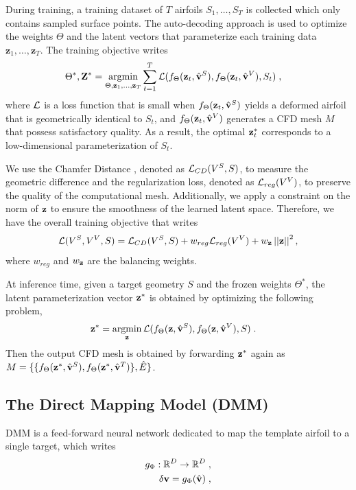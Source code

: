 During training, a training dataset of $T$ airfoils $S_1,\ldots,S_T$ is collected which only contains sampled surface points. The auto-decoding approach is used to optimize the weights $\Theta$ and the latent vectors that parameterize each training data $\textbf{z}_1,\ldots,\textbf{z}_T$. The training objective writes
%
\begin{align}
\Theta^*,\bZ^* &=  \argmin_{\Theta,\bz_1,\ldots,\bz_T} \sum_{t=1}^T \cL(f_{\Theta}(\bz_t, \hat{\bv}^S), f_{\Theta}(\bz_t, \hat{\bv}^V), S_t) \; ,
\label{ch4:eq:argmin_f_z_theta}
\end{align}
%
where $\mathcal{L}$ is a loss function that is small when $f_{\Theta}(\mathbf{z}_t, \hat{\mathbf{v}}^S)$ yields a deformed airfoil that is geometrically identical to $S_t$, and $f_{\Theta}(\mathbf{z}_t, \hat{\mathbf{v}}^V)$ generates a CFD mesh $M$ that possess satisfactory quality. As a result, the optimal $\mathbf{z}_t^*$ corresponds to a low-dimensional parameterization of $S_t$. 

We use the Chamfer Distance \cite{ai.Barrow1977}, denoted as $\mathcal{L}_{CD}(V^S, S)$, to measure the geometric difference and the regularization loss, denoted as $\mathcal{L}_{reg}(V^V)$, to preserve the quality of the computational mesh. Additionally, we apply a constraint on the norm of $\mathbf{z}$ to ensure the smoothness of the learned latent space.
Therefore, we have the overall training objective that writes
\begin{align}
\mathcal{L}(V^S, V^V, S) = \mathcal{L}_{CD}(V^S, S) + w_{reg}\mathcal{L}_{reg}(V^V) + w_{\mathbf{z}}\left|\left|\mathbf{z}\right|\right|^2 ,
\end{align}
where $w_{reg}$ and $w_{\mathbf{z}}$ are the balancing weights.

At inference time, given a target geometry $S$ and the frozen weights $\Theta^*$, the latent parameterization vector $\mathbf{z}^*$ is obtained by optimizing the following problem,
%
\begin{align}
\bz^* &=  \argmin_{\bz} \cL(f_{\Theta}(\bz, \hat{\bv}^S), f_{\Theta}(\bz, \hat{\bv}^V), S) \; .
\label{ch4:eq:agmin_f_z}
\end{align}
%
Then the output CFD mesh is obtained by forwarding $\mathbf{z}^*$ again as $M=\{\{f_{\Theta}(\mathbf{z}^*, \hat{\mathbf{v}}^S), f_{\Theta}(\mathbf{z}^*, \hat{\mathbf{v}}^T)\}, \hat{E}\}$. 

\subsection{The Direct Mapping Model (DMM)}
DMM is a feed-forward neural network dedicated to map the template airfoil to a single target, which writes
\begin{align}
    g_{\Phi} : \mathbb{R}^D \rightarrow \mathbb{R}^D \; , \label{ch4:eq:map_dmm} \\
    \mathbf{\delta v} = g_{\Phi}(\hat{\mathbf{v}}) \; , \nonumber
\end{align} 

